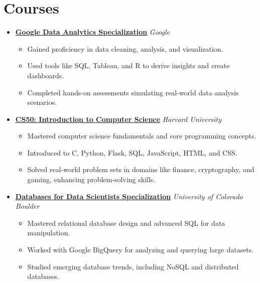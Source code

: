 \documentclass[letterpaper,11pt]{article}
\begin{document}
\section*{Courses}
\begin{itemize}[leftmargin=0.15in]
  \item \textbf{\href{https://www.coursera.org/account/accomplishments/specialization/AS9JOBALFZSL}{Google Data Analytics Specialization}} \hfill \textit{Google}\\
  \begin{itemize}[leftmargin=0.2in]
    \item Gained proficiency in data cleaning, analysis, and visualization.
    \item Used tools like SQL, Tableau, and R to derive insights and create dashboards.
    \item Completed hands-on assessments simulating real-world data analysis scenarios.
  \end{itemize}

  \item \textbf{\href{https://certificates.cs50.io/fe4b0a5a-c586-4a15-91ec-6b8a65f829e4.pdf?size=letter}{CS50: Introduction to Computer Science}} \hfill \textit{Harvard University}\\
  \begin{itemize}[leftmargin=0.2in]
    \item Mastered computer science fundamentals and core programming concepts.
    \item Introduced to C, Python, Flask, SQL, JavaScript, HTML, and CSS.
    \item Solved real-world problem sets in domains like finance, cryptography, and gaming, enhancing problem-solving skills.
  \end{itemize}

  \item \textbf{\href{https://www.coursera.org/account/accomplishments/specialization/GIPG5MXXA0FZ}{Databases for Data Scientists Specialization}} \hfill \textit{University of Colorado Boulder}\\
  \begin{itemize}[leftmargin=0.2in]
    \item Mastered relational database design and advanced SQL for data manipulation.
    \item Worked with Google BigQuery for analyzing and querying large datasets.
    \item Studied emerging database trends, including NoSQL and distributed databases.
  \end{itemize}
\end{itemize}
\end{document}
